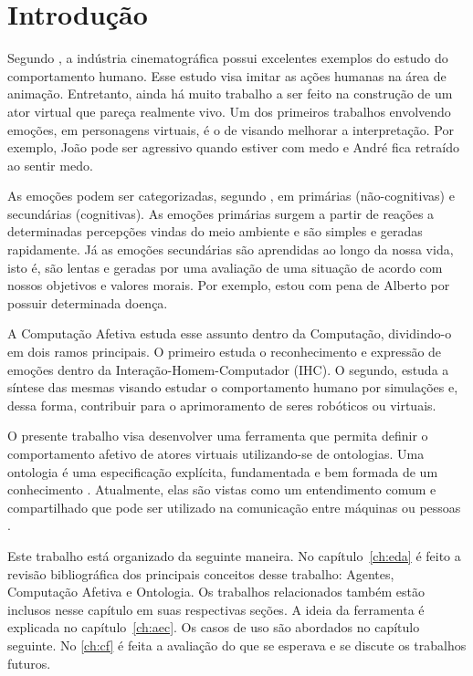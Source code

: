 \chapter{Introdução}

Segundo \citet{terzopoulos1998behavioral}, a indústria cinematográfica possui
excelentes exemplos do estudo do comportamento humano. Esse estudo visa imitar
as ações humanas na área de animação. Entretanto, ainda há muito trabalho a
ser feito na construção de um ator virtual que pareça realmente vivo. Um dos
primeiros trabalhos envolvendo emoções, em personagens virtuais, é o de
\citet{bates1994role} visando melhorar a interpretação. Por exemplo, João pode
ser agressivo quando estiver com medo e André fica retraído ao sentir medo.

As emoções podem ser categorizadas, segundo \citet{damasio2004erro}, em
primárias (não-cognitivas) e secundárias (cognitivas). As emoções primárias
surgem a partir de reações a determinadas percepções vindas do meio ambiente e
são simples e geradas rapidamente. Já as emoções secundárias são aprendidas ao
longo da nossa vida, isto é, são lentas e geradas por uma avaliação de uma
situação de acordo com nossos objetivos e valores morais. Por exemplo, estou
com pena de Alberto por possuir determinada doença.

A Computação Afetiva estuda esse assunto dentro da Computação, dividindo-o em
dois ramos principais. O primeiro estuda o reconhecimento e expressão de
emoções dentro da Interação-Homem-Computador (IHC). O segundo, estuda a
síntese das mesmas visando estudar o comportamento humano por simulações e,
dessa forma, contribuir para o aprimoramento de seres robóticos ou virtuais.

O presente trabalho visa desenvolver uma ferramenta que permita definir o
comportamento afetivo de atores virtuais utilizando-se de ontologias. Uma
ontologia é uma especificação explícita, fundamentada e bem formada de um
conhecimento \cite{gruber1993translation}. Atualmente, elas são vistas como um
entendimento comum e compartilhado que pode ser utilizado na comunicação entre
máquinas ou pessoas \cite{wks2008towards}.

Este trabalho está organizado da seguinte maneira. No capítulo~\ref{ch:eda}
é feito a revisão bibliográfica dos principais conceitos desse trabalho:
Agentes, Computação Afetiva e Ontologia. Os trabalhos relacionados também
estão inclusos nesse capítulo em suas respectivas seções. A ideia da
ferramenta é explicada no capítulo~\ref{ch:aec}. Os casos de uso são abordados no
capítulo seguinte. No \ref{ch:cf} é feita a avaliação do que se esperava e se
discute os trabalhos futuros.
